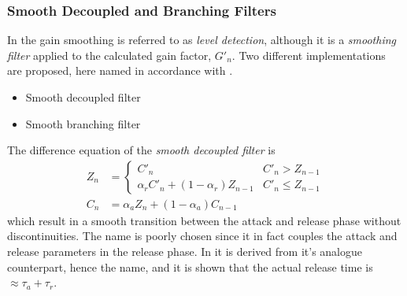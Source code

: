 \documentclass[../main2.tex]{subfiles}
\begin{document}
\subsubsection{Smooth Decoupled and Branching Filters}
In \cite{reiss2012tutorial} the gain smoothing is referred to as \emph{level detection}, although it is a \emph{smoothing filter} applied to the calculated gain factor, $G'_n$. Two different implementations are proposed, here named in accordance with \cite{reiss2012tutorial}.
\begin{itemize}
\item{Smooth decoupled filter}
\item{Smooth branching filter}
\end{itemize}
The difference equation of the \emph{smooth decoupled filter} is
\begin{equation}
\begin{split}
Z_n &= \begin{cases}
   C'_n								& C'_n > Z_{n-1} \\
    \alpha_{r} C'_n + (1-\alpha_{r}) Z_{n-1} 	& C'_n \leq Z_{n-1}
\end{cases} \\
C_n &= \alpha_{a} Z_n + (1-\alpha_{a}) C_{n-1}
\end{split}
\end{equation}
which result in a smooth transition between the attack and release phase without discontinuities. The name is poorly chosen since it in fact couples the attack and release parameters in the release phase. In \cite{reiss2012tutorial} it is derived from it's analogue counterpart, hence the name, and it is shown that the actual release time is $\approx \tau_a + \tau_r$.
\end{document}

